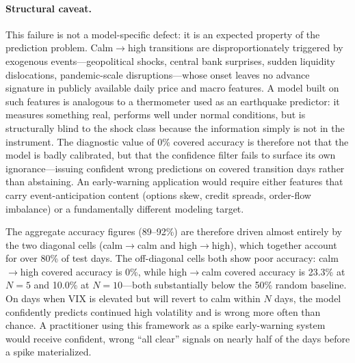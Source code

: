 \documentclass[12pt]{article}
\begin{document}
\paragraph{Structural caveat.}
This failure is not a model-specific defect: it is an expected property of the prediction problem. Calm$\to$high transitions are disproportionately triggered by exogenous events---geopolitical shocks, central bank surprises, sudden liquidity dislocations, pandemic-scale disruptions---whose onset leaves no advance signature in publicly available daily price and macro features. A model built on such features is analogous to a thermometer used as an earthquake predictor: it measures something real, performs well under normal conditions, but is structurally blind to the shock class because the information simply is not in the instrument. The diagnostic value of 0\% covered accuracy is therefore not that the model is badly calibrated, but that the confidence filter fails to surface its own ignorance---issuing confident wrong predictions on covered transition days rather than abstaining. An early-warning application would require either features that carry event-anticipation content (options skew, credit spreads, order-flow imbalance) or a fundamentally different modeling target.

The aggregate accuracy figures (89--92\%) are therefore driven almost entirely by the two diagonal cells (calm$\to$calm and high$\to$high), which together account for over 80\% of test days. The off-diagonal cells both show poor accuracy: calm$\to$high covered accuracy is 0\%, while high$\to$calm covered accuracy is 23.3\% at $N = 5$ and 10.0\% at $N = 10$---both substantially below the 50\% random baseline. On days when VIX is elevated but will revert to calm within $N$ days, the model confidently predicts continued high volatility and is wrong more often than chance. A practitioner using this framework as a spike early-warning system would receive confident, wrong ``all clear'' signals on nearly half of the days before a spike materialized.
\end{document}
